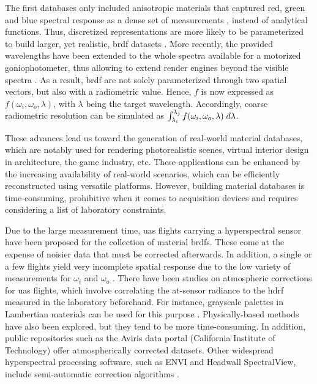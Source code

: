 The first databases only included anisotropic materials that captured red, green and blue spectral response as a dense set of measurements \cite{matusik_data-driven_2003}, instead of analytical functions. Thus, discretized representations are more likely to be parameterized to build larger, yet realistic, \acrshort{brdf} datasets \cite{serrano_intuitive_2016}. More recently, the provided wavelengths have been extended to the whole spectra available for a motorized goniophotometer, thus allowing to extend render engines beyond the visible spectra \cite{dupuy_adaptive_2018}. As a result, \acrshort{brdf} are not solely parameterized through two spatial vectors, but also with a radiometric value. Hence, $f$ is now expressed as $f(\omega_i, \omega_o, \lambda)$, with $\lambda$ being the target wavelength. Accordingly, coarse radiometric resolution can be simulated as $\int_{\lambda_i}^{\lambda_j} f(\omega_i, \omega_o, \lambda) \hspace{1mm} d\lambda$. 

These advances lead us toward the generation of real-world material databases, which are notably used for rendering photorealistic scenes, virtual interior design in architecture, the game industry, etc. These applications can be enhanced by the increasing availability of real-world scenarios, which can be efficiently reconstructed using versatile platforms. However, building material databases is time-consuming, prohibitive when it comes to acquisition devices and requires considering a list of laboratory constraints. 

Due to the large measurement time, \acrshort{uas} flights carrying a hyperspectral sensor have been proposed for the collection of material \acrshort{brdf}s. These come at the expense of noisier data that must be corrected afterwards. In addition, a single or a few flights yield very incomplete spatial response due to the low variety of measurements for $\omega_i$ and $\omega_o$ \cite{jurado_efficient_2022}. There have been studies on atmospheric corrections for \acrshort{uas} flights, which involve correlating the at-sensor radiance to the \acrshort{hdrf} measured in the laboratory beforehand. For instance, grayscale palettes in Lambertian materials can be used for this purpose  \cite{lucieer_hyperuasimaging_2014}. Physically-based methods have also been explored, but they tend to be more time-consuming. In addition, public repositories such as the Aviris data portal (California Institute of Technology) \cite{california_institute_of_technology_aviris_nodate} offer atmospherically corrected datasets. Other widespread hyperspectral processing software, such as ENVI and Headwall SpectralView, include semi-automatic correction algorithms \cite{queally_flexbrdf_2022, jia_kernel-driven_2020, sagan_data-driven_2022}.

